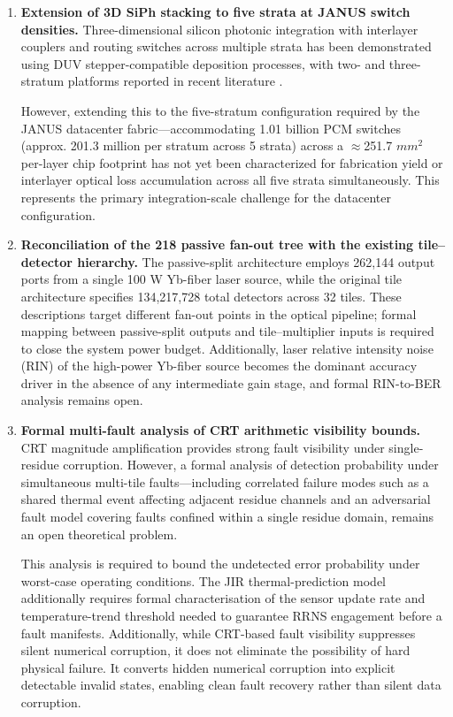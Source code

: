 \documentclass[journal]{IEEEtran}
\begin{document}
\begin{enumerate}
\item \textbf{Extension of 3D SiPh stacking to five strata at JANUS switch densities.} Three-dimensional silicon photonic integration with interlayer couplers and routing switches across multiple strata has been demonstrated using DUV stepper-compatible deposition processes, with two- and three-stratum platforms reported in recent literature \cite{Feldmann2019}. 

However, extending this to the five-stratum configuration required by the JANUS datacenter fabric---accommodating 1.01 billion PCM switches (approx. 201.3 million per stratum across 5 strata) across a $\approx$251.7 $mm^{2}$ per-layer chip footprint has not yet been characterized for fabrication yield or interlayer optical loss accumulation across all five strata simultaneously. This represents the primary integration-scale challenge for the datacenter configuration.

\item \textbf{Reconciliation of the 218 passive fan-out tree with the existing tile--detector hierarchy.} The passive-split architecture employs 262,144 output ports from a single 100 W Yb-fiber laser source, while the original tile architecture specifies 134,217,728 total detectors across 32 tiles. These descriptions target different fan-out points in the optical pipeline; formal mapping between passive-split outputs and tile--multiplier inputs is required to close the system power budget. Additionally, laser relative intensity noise (RIN) of the high-power Yb-fiber source becomes the dominant accuracy driver in the absence of any intermediate gain stage, and formal RIN-to-BER analysis remains open.

\item \textbf{Formal multi-fault analysis of CRT arithmetic visibility bounds.} CRT magnitude amplification provides strong fault visibility under single-residue corruption. However, a formal analysis of detection probability under simultaneous multi-tile faults---including correlated failure modes such as a shared thermal event affecting adjacent residue channels and an adversarial fault model covering faults confined within a single residue domain, remains an open theoretical problem. 

This analysis is required to bound the undetected error probability under worst-case operating conditions. The JIR thermal-prediction model additionally requires formal characterisation of the sensor update rate and temperature-trend threshold needed to guarantee RRNS engagement before a fault manifests. Additionally, while CRT-based fault visibility suppresses silent numerical corruption, it does not eliminate the possibility of hard physical failure. It converts hidden numerical corruption into explicit detectable invalid states, enabling clean fault recovery rather than silent data corruption.
\end{enumerate}
\end{document}
